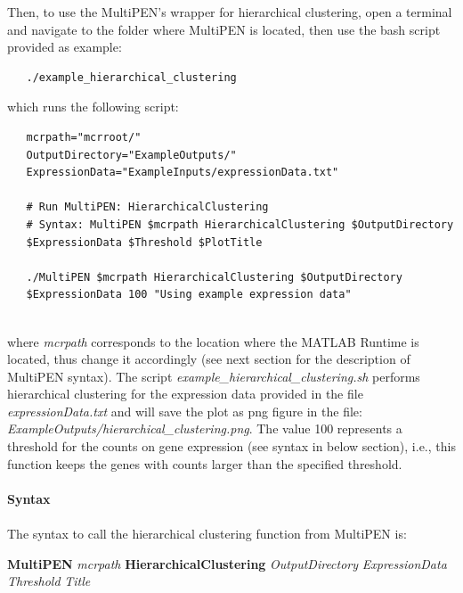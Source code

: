 \documentclass[11pt, oneside]{article}   	%
\begin{document}
Then,  to use the MultiPEN's wrapper for hierarchical clustering, open a terminal and navigate to the folder where MultiPEN is located, then use the bash script provided as example: 

\begin{framed}
\begin{verbatim}
   ./example_hierarchical_clustering
\end{verbatim}
\end{framed}


\noindent which runs the following script:

\begin{framed}
\begin{verbatim}
   mcrpath="mcrroot/"
   OutputDirectory="ExampleOutputs/"
   ExpressionData="ExampleInputs/expressionData.txt"

   # Run MultiPEN: HierarchicalClustering
   # Syntax: MultiPEN $mcrpath HierarchicalClustering $OutputDirectory 
   $ExpressionData $Threshold $PlotTitle

   ./MultiPEN $mcrpath HierarchicalClustering $OutputDirectory 
   $ExpressionData 100 "Using example expression data"
   
\end{verbatim}
\end{framed}

\noindent where {\it mcrpath} corresponds to the location where the MATLAB Runtime is located, thus change it accordingly (see next section for the description of MultiPEN syntax). The script {\it example\_hierarchical\_clustering.sh} performs hierarchical clustering for the expression data provided in the file {\it expressionData.txt} and will save the plot as png figure in the file: {\it ExampleOutputs/hierarchical\_clustering.png}. The value 100 represents a threshold for the counts on gene expression (see syntax in below section), i.e., this function keeps the genes with counts larger than the specified threshold. 


\paragraph{Syntax}
\paragraph{}

The syntax to call the hierarchical clustering function from MultiPEN is:

\begin{framed}
   {\bf MultiPEN} {\it mcrpath} {\bf HierarchicalClustering} {\it OutputDirectory} 
   {\it ExpressionData} {\it Threshold} {\it Title}
\end{framed}
\end{document}
